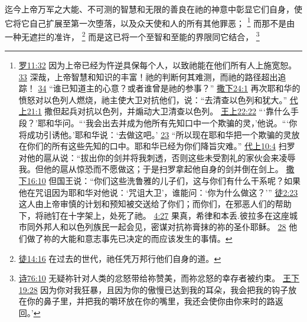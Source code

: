 \documentclass[12pt, a4paper, oneside]{ctexart}
\newcounter{parnum}[section]
\newcommand{\N}{%
   \noindent\refstepcounter{parnum}%
    \makebox[\parindent][l]{\textbf{\arabic{parnum}.}}}
\begin{document}
\N 迄今上帝万军之大能、不可测的智慧和无限的善良在祂的神意中彰显它们自身，使它将它自己扩展至第一次堕落，以及众天使和人的所有其他罪恶；
	\footnote {
		\href{https://biblehub.com/romans/11-32.htm}{罗11:32} 因为上帝已经为忤逆具保每个人，以致祂能在他们所有人上施宽恕。
		\href{https://biblehub.com/romans/11-33.htm}{33} 深哉，上帝智慧和知识的丰富！祂的判断何其难测，而祂的路径超出追踪！
		\href{https://biblehub.com/romans/11-34.htm}{34} “谁已知道主的心意？或者谁曾是祂的参事？”
		\href{https://biblehub.com/2_samuel/24-1.htm}{撒下24:1} 再次耶和华的愤怒对以色列人燃烧，祂主使大卫对抗他们，说：“去清查以色列和犹大。”
		\href{https://biblehub.com/1_chronicles/21-1.htm}{代上21:1} 撒但起兵对抗以色列，并煽动大卫清查以色列。
		\href{https://biblehub.com/1_kings/22-22.htm}{王上22:22} “‘靠什么手段？’耶和华问。“‘我会出去并成为他所有先知口中一个欺骗的灵，’他说。“‘你将成功引诱他。’耶和华说：‘去做这吧。’
		\href{https://biblehub.com/1_kings/22-23.htm}{23} “所以现在耶和华把一个欺骗的灵放在你们的所有这些先知的口中。耶和华已经为你们降旨灾难。”
		\href{https://biblehub.com/1_chronicles/10-4.htm}{代上10:4} 扫罗对他的扈从说：“拔出你的剑并将我刺透，否则这些未受割礼的家伙会来凌辱我。但他的扈从惊恐而不愿做这；于是扫罗拿起他自身的剑并倒在剑上。
		\href{https://biblehub.com/2_samuel/16-10.htm}{撒下16:10} 但国王说：“你们这些洗鲁雅的儿子们，这与你们有什么干系呢？如果他在咒诅因为耶和华对他说：‘咒诅大卫’，谁能问：‘你为什么做这？’”
		\href{https://biblehub.com/acts/2-23.htm}{徒2:23} 这人由上帝审慎的计划和预知被交送给了你们；而你们，在邪恶人们的帮助下，将祂钉在十字架上，处死了祂。
		\href{https://biblehub.com/acts/4-27.htm}{4:27} 果真，希律和本丢.彼拉多在这座城市同外邦人和以色列族民一起会见，密谋对抗祢膏抹的祢的圣仆耶稣。
		\href{https://biblehub.com/acts/4-28.htm}{28} 他们做了祢的大能和意志事先已决定的而应该发生的事情。
	}
	而那不是由一种无遮拦的准许，
	\footnote {
		\href{https://biblehub.com/acts/14-16.htm}{徒14:16} 在过去的世代，祂任凭万邦行他们自身的道。
	}
	而是这已将一个至智和至能的界限同它结合，
	\footnote {
		\href{https://biblehub.com/psalms/76-10.htm}{诗76:10} 无疑祢针对人类的忿怒带给祢赞美，而祢忿怒的幸存者被约束。
		\href{https://biblehub.com/2_kings/19-28.htm}{王下19:28} 因为你对我狂暴，且因为你的傲慢已达到我的耳朵，我会把我的钩子放在你的鼻子里，并把我的嚼环放在你的嘴里，我还会使你由你来时的路返回。’
	}
\end{document}

